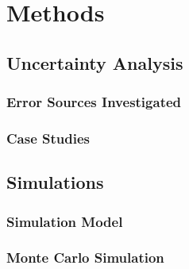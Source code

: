 \section{Methods}


\subsection{Uncertainty Analysis}


\subsubsection{Error Sources Investigated}


\subsubsection{Case Studies}





\subsection{Simulations}



\subsubsection{Simulation Model}



\subsubsection{Monte Carlo Simulation}




